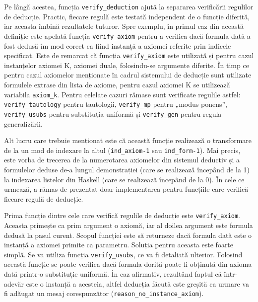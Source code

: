 \documentclass[12pt, openany]{book}
\begin{document}
            \par{}
                Pe lângă acestea, funcția \texttt{verify\_deduction} ajută la separarea verificării regulilor de 
                deducție. Practic, fiecare regulă este testată independent de o funcție diferită, iar aceasta îmbină 
                rezultatele tuturor. Spre exemplu, în primul caz din această definiție este apelată funcția 
                \texttt{verify\_axiom} pentru a verifica dacă formula dată a fost dedusă îm mod corect ca fiind instanță 
                a axiomei referite prin indicele specificat. Este de remarcat că funcția \texttt{verify\_axiom} este 
                utilizată și pentru cazul instanțelor axiomei K, axiomei duale, folosindu-se argumente diferite. În timp 
                ce pentru cazul axiomelor menționate în cadrul sistemului de deducție sunt utilizate formulele extrase 
                din lista de axiome, pentru cazul axiomei K se utilizează variabila \texttt{axiom\_k}. Pentru celelate 
                cazuri rămase sunt verificate regulile astfel: \texttt{verify\_tautology} pentru tautologii, 
                \texttt{verify\_mp} pentru „modus ponens”, \texttt{verify\_usubs} pentru substituția uniformă și 
                \texttt{verify\_gen} pentru regula generalizării.
            
            \par{}
                Alt lucru care trebuie menționat este că această funcție realizează o transformare de la un mod de 
                indexare la altul (\texttt{ind\_axiom-1} sau \texttt{ind\_form-1}). Mai precis, este vorba de trecerea 
                de la numerotarea axiomelor din sistemul deductiv și a formulelor deduse de-a lungul demonstrației (care 
                se realizează începând de la 1) la indexarea listelor din Haskell (care se realizează începând de la 0). 
                În cele ce urmează, a rămas de prezentat doar implementarea pentru funcțiile care verifică fiecare 
                regulă de deducție.

            \par{}
                Prima funcție dintre cele care verifică regulile de deducție este \texttt{verify\_axiom}. Aceasta 
                primește ca prim argument o axiomă, iar al doilea argument este formula dedusă la pasul curent. Scopul 
                funcției este să returneze dacă formula dată este o instanță a axiomei primite ca parametru. Soluția 
                pentru aceasta este foarte simplă. Se va utiliza funcția \texttt{verify\_usubs}, ce va fi detaliată 
                ulterior. Folosind această funcție se poate verifica dacă formula dorită poate fi obținută din axioma 
                dată printr-o substituție uniformă. În caz afirmativ, rezultând faptul că într-adevăr este o instanță a 
                acesteia, altfel deducția făcută este greșită ca urmare va fi adăugat un mesaj corespunzător 
                (\texttt{reason\_no\_instance\_axiom}).
\end{document}
